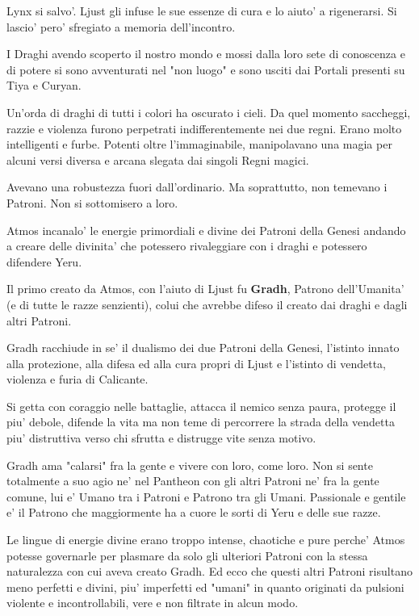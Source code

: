 \documentclass[a4paper,11pt,twoside,openany]{book}
\begin{document}
{Lynx si salvo'. Ljust gli infuse le sue essenze di cura e lo aiuto' a rigenerarsi. Si lascio' pero' sfregiato a memoria dell'incontro.

I Draghi avendo scoperto il nostro mondo e mossi dalla loro sete di conoscenza e di potere si sono avventurati nel "non luogo" e sono usciti dai Portali presenti su Tiya e Curyan.

Un'orda di draghi di tutti i colori ha oscurato i cieli. Da quel momento saccheggi, razzie e violenza furono perpetrati indifferentemente nei due regni. Erano molto intelligenti e furbe. Potenti oltre l'immaginabile, manipolavano una magia per alcuni versi diversa e arcana slegata dai singoli Regni magici.

Avevano una robustezza fuori dall'ordinario. Ma soprattutto, non temevano i Patroni. Non si sottomisero a loro.

Atmos incanalo' le energie primordiali e divine dei Patroni della Genesi andando a creare delle divinita' che potessero rivaleggiare con i draghi e potessero difendere Yeru.

Il primo creato da Atmos, con l'aiuto di Ljust fu \textbf{Gradh}, Patrono dell'Umanita' (e di tutte le razze senzienti), colui che avrebbe difeso il creato dai draghi e dagli altri Patroni.

Gradh racchiude in se' il dualismo dei due Patroni della Genesi, l'istinto innato alla protezione, alla difesa ed alla cura propri di Ljust e l'istinto di vendetta, violenza e furia di Calicante.

Si getta con coraggio nelle battaglie, attacca il nemico senza paura, protegge il piu' debole, difende la vita ma non teme di percorrere la strada della vendetta piu' distruttiva verso chi sfrutta e distrugge vite senza motivo.

Gradh ama "calarsi" fra la gente e vivere con loro, come loro. 
Non si sente totalmente a suo agio ne' nel Pantheon con gli altri Patroni ne' fra la gente comune, lui e' Umano tra i Patroni e Patrono tra gli Umani. Passionale e gentile e' il Patrono che maggiormente ha a cuore le sorti di Yeru e delle sue razze.

Le lingue di energie divine erano troppo intense, chaotiche e pure perche' Atmos potesse governarle per plasmare da solo gli ulteriori Patroni con la stessa naturalezza con cui aveva creato Gradh. Ed ecco che questi altri Patroni risultano meno perfetti e divini, piu' imperfetti ed "umani" in quanto originati da pulsioni violente e incontrollabili, vere e non filtrate in alcun modo.

}
\end{document}
